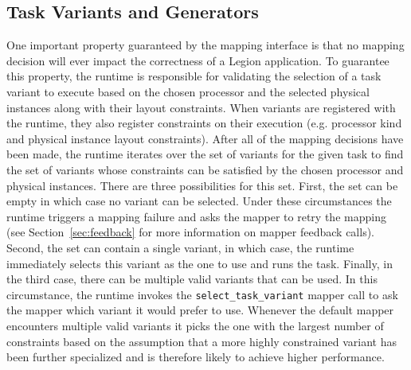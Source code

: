 \subsection{Task Variants and Generators}
\label{subsec:generators}
One important property guaranteed by the mapping interface is
that no mapping decision will ever impact the correctness of
a Legion application. To guarantee this property, the runtime
is responsible for validating the selection of a task variant
to execute based on the chosen processor and the selected
physical instances along with their layout constraints. When
variants are registered with the runtime, they also register
constraints on their execution (e.g. processor kind and physical
instance layout constraints). After all of the mapping 
decisions have been made, the runtime iterates over the set
of variants for the given task to find the set of variants whose 
constraints can be satisfied by the chosen
processor and physical instances. There are three possibilities
for this set.  First, the set can be empty in which case
no variant can be selected.  Under these circumstances the 
runtime triggers a mapping failure and asks the mapper to 
retry the mapping (see Section~\ref{sec:feedback} for more
information on mapper feedback calls).  Second, the set can contain a single
variant, in which case, the runtime immediately selects
this variant as the one to use and runs the task.  Finally,
in the third case, there can be multiple valid variants
that can be used. In this circumstance, the runtime 
invokes the {\tt select\_task\_variant} mapper call to 
ask the mapper which variant it would prefer to use.
Whenever the default mapper encounters multiple valid variants
it picks the one with the largest number of constraints 
based on the assumption that a more highly constrained
variant has been further specialized and is therefore likely
to achieve higher performance.

